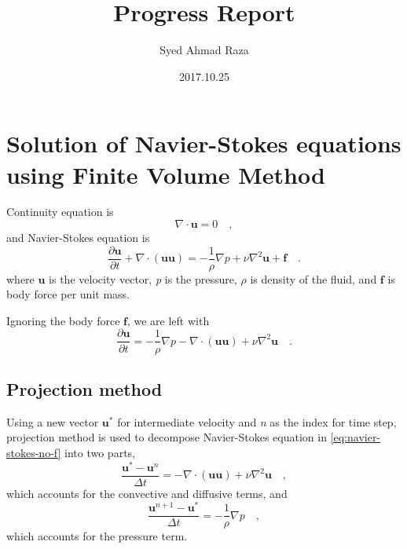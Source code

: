 \documentclass[12pt,a4paper,fleqn]{article}
\title{Progress Report}
\author{Syed Ahmad Raza}
\date{2017.10.25}
\begin{document}
\maketitle
\tableofcontents
\pagebreak

\section{Solution of Navier-Stokes equations using Finite Volume Method}

Continuity equation is
\begin{equation}\label{eq:continuity}
\nabla \cdot \mathbf{u} = 0 \quad,
\end{equation}
and Navier-Stokes equation is
\begin{equation}\label{eq:navier-stokes}
\frac{\partial \mathbf{u}}{\partial t}+\nabla \cdot (\mathbf{u}\mathbf{u}) = -\frac{1}{\rho}\nabla p + \nu \nabla^2 \mathbf{u}+\mathbf{f} \quad.
\end{equation}
where $\mathbf{u}$ is the velocity vector, \textit{p} is the pressure, $\rho$ is density of the fluid, and $\mathbf{f}$ is body force per unit mass.

Ignoring the body force $\mathbf{f}$, we are left with
\begin{equation}\label{eq:navier-stokes-no-f}
\frac {\partial \mathbf{u}}{\partial t} = -\frac{1}{\rho}\nabla p -\nabla \cdot (\mathbf{uu}) + \nu \nabla^2 \mathbf{u} \quad.
\end{equation}

\subsection{Projection method}
Using a new vector $\mathbf{u}^*$ for intermediate velocity and \textit{n} as the index for time step, projection method is used to decompose Navier-Stokes equation in \eqref{eq:navier-stokes-no-f} into two parts,
\begin{equation}\label{eq:projection01}
\frac{\mathbf{u}^*-\mathbf{u}^n}{\Delta t} = -\nabla \cdot (\mathbf{u}\mathbf{u})+ \nu \nabla^2 \mathbf{u} \quad,
\end{equation}
which accounts for the convective and diffusive terms, and
\begin{equation}\label{eq:projection02}
\frac{\mathbf{u}^{n+1}-\mathbf{u}^*}{\Delta t}=-\frac{1}{\rho}\nabla p \quad,
\end{equation}
which accounts for the pressure term.
\end{document}
